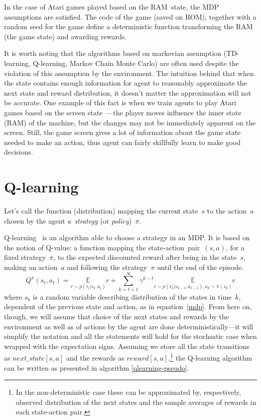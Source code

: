 In the case of Atari games played based on the RAM~state, the MDP assumptions are satisfied. The code of the game (saved on ROM), together with a random seed for the game define a deterministic function transforming the RAM (the game state) and awarding rewards.

It is worth noting that the algorithms based on markovian assumption (TD-learning, Q-learning, Markov Chain Monte Carlo) are often used despite the violation of this assumption by the environment. The intuition behind that when the state contains enough information for agent to reasonably approximate the next state and reward distribution, it doesn't matter the approximation will not be accurate. One example of this fact is when we train agents to play Atari games based on the screen state~\cite{nips-dqn}---the player moves influence the inner state (RAM) of the machine, but the changes may not be immediately apparent on the screen. Still, the game screen gives a lot of information about the game state needed to make an action, thus agent can fairly skillfully learn to make good decisions.

\section{Q-learning}\label{qlearning}
Let's call the function (distribution) mapping the current state~$s$ to the action~$a$ chosen by the agent \emph{a~strategy} (or \emph{policy})~$\pi$.

Q-learning~\cite{qlearning, qlearning-old} is an algorithm able to choose a strategy in an MDP. It is based on the notion of Q-value: a function mapping the state-action~pair~$(s, a)$, for a fixed strategy~$\pi$, to the expected discounted reward after being in the state~$s$, making an action~$a$ and following the strategy~$\pi$ until the end of the episode.
\begin{equation}\label{q-value}
  Q^\pi(s_t, a_t) = \underset{r\sim p(r_t | s_t, a_t)}{\mathbb{E}} r + \sum_{k=t+1}^\infty \gamma^{k-t}\underset{r\sim p(r_k|s_{k-1}, a_{k-1}), a_k\sim \pi(s_k)}{\mathbb{E}} r
\end{equation}
where $s_k$ is a random variable describing distribution of the states in time~$k$, dependent of the previous state and action, as in equation~\eqref{mdp}. From here on, though, we will assume that choice of the next states and rewards by the environment as well as of actions by the agent are done deterministically---it will simplify the notation and all the statements will hold for the stochastic case when wrapped with the expectation signs. Assuming we store all the state transitions as $next\_state[s, a]$ and the rewards as $reward[s, a]$,\footnote{In the non-deterministic case these can be approximated by, respectively, observed distribution of the next states and the sample averages of rewards in each state-action pair.} the Q-learning algorithm can be written as presented in algorithm \ref{qlearning-pseudo}.

